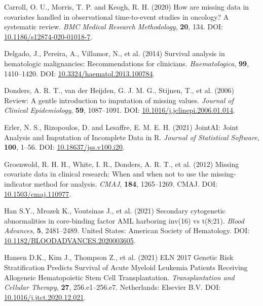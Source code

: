 \documentclass[
  letterpaper,
  DIV=11,
  numbers=noendperiod]{scrreprt}
\newlength{\cslhangindent}
\newlength{\cslentryspacingunit} %
\newenvironment{CSLReferences}[2] %
 {%
  \setlength{\parindent}{0pt}
  \ifodd #1
  \let\oldpar\par
  \def\par{\hangindent=\cslhangindent\oldpar}
  \fi
  \setlength{\parskip}{#2\cslentryspacingunit}
 }%
 {}
\begin{document}
\begin{CSLReferences}{1}{0}
\leavevmode{}%
Carroll, O. U., Morris, T. P. and Keogh, R. H. (2020) How are missing
data in covariates handled in observational time-to-event studies in
oncology? {A} systematic review. \emph{BMC Medical Research
Methodology}, \textbf{20}, 134. DOI:
\href{https://doi.org/10.1186/s12874-020-01018-7}{10.1186/s12874-020-01018-7}.

\leavevmode{}%
Delgado, J., Pereira, A., Villamor, N., et al. (2014) Survival analysis
in hematologic malignancies: Recommendations for clinicians.
\emph{Haematologica}, \textbf{99}, 1410--1420. DOI:
\href{https://doi.org/10.3324/haematol.2013.100784}{10.3324/haematol.2013.100784}.

\leavevmode{}%
Donders, A. R. T., van der Heijden, G. J. M. G., Stijnen, T., et al.
(2006) Review: {A} gentle introduction to imputation of missing values.
\emph{Journal of Clinical Epidemiology}, \textbf{59}, 1087--1091. DOI:
\href{https://doi.org/10.1016/j.jclinepi.2006.01.014}{10.1016/j.jclinepi.2006.01.014}.

\leavevmode{}%
Erler, N. S., Rizopoulos, D. and Lesaffre, E. M. E. H. (2021) {JointAI}:
{Joint Analysis} and {Imputation} of {Incomplete Data} in {R}.
\emph{Journal of Statistical Software}, \textbf{100}, 1--56. DOI:
\href{https://doi.org/10.18637/jss.v100.i20}{10.18637/jss.v100.i20}.

\leavevmode{}%
Groenwold, R. H. H., White, I. R., Donders, A. R. T., et al. (2012)
Missing covariate data in clinical research: When and when not to use
the missing-indicator method for analysis. \emph{CMAJ}, \textbf{184},
1265--1269. CMAJ. DOI:
\href{https://doi.org/10.1503/cmaj.110977}{10.1503/cmaj.110977}.

\leavevmode{}%
Han S.Y., Mrozek K., Voutsinas J., et al. (2021) Secondary cytogenetic
abnormalities in core-binding factor {AML} harboring inv(16) vs t(8;21).
\emph{Blood Advances}, \textbf{5}, 2481--2489. United States: American
Society of Hematology. DOI:
\href{https://doi.org/10.1182/BLOODADVANCES.2020003605}{10.1182/BLOODADVANCES.2020003605}.

\leavevmode{}%
Hansen D.K., Kim J., Thompson Z., et al. (2021) {ELN} 2017 {Genetic Risk
Stratification Predicts Survival} of {Acute Myeloid Leukemia Patients
Receiving Allogeneic Hematopoietic Stem Cell Transplantation}.
\emph{Transplantation and Cellular Therapy}, \textbf{27},
256.e1--256.e7. Netherlands: Elsevier B.V. DOI:
\href{https://doi.org/10.1016/j.jtct.2020.12.021}{10.1016/j.jtct.2020.12.021}.


\end{CSLReferences}
\end{document}
